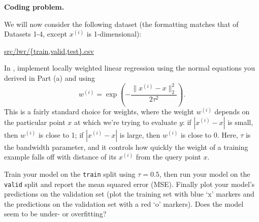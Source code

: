 \item {} \textbf{Coding problem.}

We will now consider the following dataset (the
formatting matches that of Datasets 1-4, except $x^{(i)}$ is 1-dimensional):
\begin{center}
	\url{src/lwr/{train,valid,test}.csv}	
\end{center}

In , implement locally weighted linear regression
using the normal equations you derived in Part (a) and using
%
\begin{equation*}
	w^{(i)} = \exp\left(-\frac{\|x^{(i)} - x\|_2^2}{2\tau^2}\right).
\end{equation*}
%
This is a fairly standard choice for weights, where the weight $w^{(i)}$ depends on the particular point $x$ at which we're trying to evaluate $y$:  if $|x^{(i)} - x|$ is small, then $w^{(i)}$ is close to 1; if $|x^{(i)} - x|$ is large, then $w^{(i)}$ is close to 0. Here, $\tau$ is the bandwidth parameter, and it controls how quickly the weight of a training example falls off with distance of its $x^{(i)}$ from the query point $x$.

Train your model on the \texttt{train} split using $\tau = 0.5$, then run your
model on the \texttt{valid} split and report the mean squared error (MSE).
Finally plot your model's predictions on the validation set (plot the
training set with blue `x' markers and the predictions on the
validation set with a red `o' markers). Does the model seem to be under-
or overfitting?


